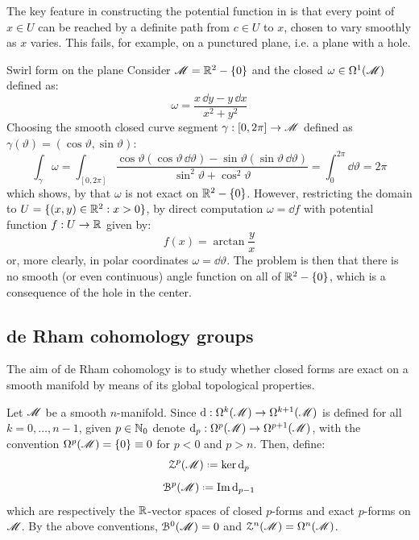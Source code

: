 The key feature in constructing the potential function in  is that every point of $ x \in U $ can be reached by a definite path from $ c \in U $ to $ x $, chosen to vary smoothly as $ x $ varies. This fails, for example, on a punctured plane, i.e. a plane with a hole.

\begin{example}{Swirl form on the plane}{}
  Consider $ \mathscr{M} = \mathbb{R}^2 - \{0\} $ and the closed $ \omega \in \Omega^{1}(\mathscr{M}) $ defined as:
  \begin{equation*}
    \omega = \frac{x \, \dd y - y \, \dd x}{x^2 + y^2}
  \end{equation*}
  Choosing the smooth closed curve segment $ \gamma : [0,2\pi] \rightarrow \mathscr{M} $ defined as $ \gamma(\vartheta) = (\cos \vartheta , \sin \vartheta) $:
  \begin{equation*}
    \int_\gamma \omega = \int_{[0,2\pi]} \frac{\cos \vartheta (\cos \vartheta \, \dd \vartheta) - \sin \vartheta (\sin \vartheta \, \dd \vartheta)}{\sin^2 \vartheta + \cos^2 \vartheta} = \int_0^{2\pi} \dd \vartheta = 2\pi
  \end{equation*}
  which shows, by  that $ \omega $ is not exact on $ \mathbb{R}^2 - \{0\} $. However, restricting the domain to $ U = \{(x,y) \in \mathbb{R}^2 : x > 0\} $, by direct computation $ \omega = \dd f $ with potential function $ f : U \rightarrow \mathbb{R} $ given by:
  \begin{equation*}
    f(x) = \arctan \frac{y}{x}
  \end{equation*}
  or, more clearly, in polar coordinates $ \omega = \dd \vartheta $. The problem is then that there is no smooth (or even continuous) angle function on all of $ \mathbb{R}^2 - \{0\} $, which is a consequence of the hole in the center.
\end{example}

\subsection{de Rham cohomology groups}
\label{ssec:de-rham-cohomology-groups}

The aim of de Rham cohomology is to study whether closed forms are exact on a smooth manifold by means of its global topological properties.

Let $ \mathscr{M} $ be a smooth $ n $-manifold. Since $ \mathrm{d} : \Omega^{k}(\mathscr{M}) \rightarrow \Omega^{k+1}(\mathscr{M}) $ is defined for all $ k = 0 , \dots , n-1 $, given $ p \in \mathbb{N}_0 $ denote $ \mathrm{d}_p : \Omega^{p}(\mathscr{M}) \rightarrow \Omega^{p+1}(\mathscr{M}) $, with the convention $ \Omega^{p}(\mathscr{M}) = \{0\} \equiv 0 $ for $ p < 0 $ and $ p > n $. Then, define:
\begin{equation}
  \zp{p}(\man) \defeq \ker \dd_p
\end{equation}
\begin{equation}
  \bp{p}(\man) \defeq \im \dd_{p-1}
\end{equation}
which are respectively the $ \mathbb{R} $-vector spaces of closed $ p $-forms and exact $ p $-forms on $ \mathscr{M} $. By the above conventions, $ \EuScript{B}^{0}(\mathscr{M}) = 0 $ and $ \EuScript{Z}^{n}(\mathscr{M}) = \Omega^{n}(\mathscr{M}) $.

